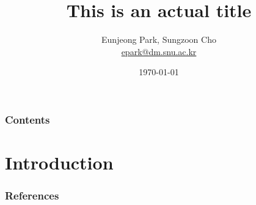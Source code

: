\documentclass[compress, 11pt, t]{beamer}
\begin{document}
\title{This is an actual title}
\author[E. Park et al.]{Eunjeong Park, Sungzoon Cho\\\href{mailto:epark@dm.snu.ac.kr}{epark@dm.snu.ac.kr}}
\date{\today}

{
\begin{frame}[plain]
  \titlepage
\end{frame}
}

\begin{frame}\frametitle{Contents}
    \tableofcontents
\end{frame}

\section[Intro]{Introduction}

\begin{frame}[t, allowframebreaks]\frametitle{References}
    \nocite{*} %
    \printbibliography
\end{frame}
\end{document}
